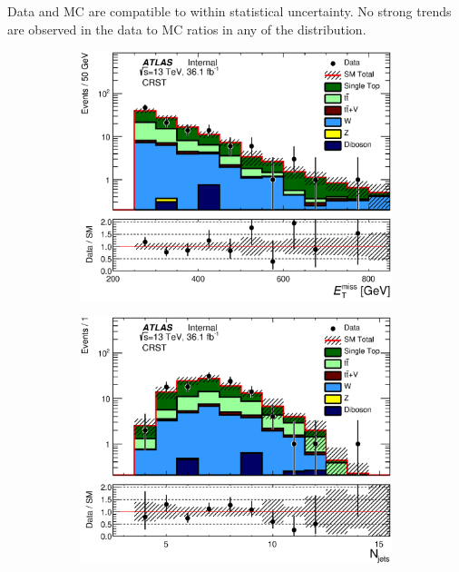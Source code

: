 \indent  Data and MC are compatible to within statistical uncertainty.  No strong trends are observed in the data to MC ratios in any of the distribution. \\

%  

\pagebreak
 
\begin{figure}[h!]
\begin{center}
      \begin{subfigure}[b]{0.40\textwidth}    
\includegraphics[width=\textwidth]{figures/singleTop/postfit/Met_CRST_log.eps}
                 \caption{ }
    \end{subfigure}
     \begin{subfigure}[b]{0.40\textwidth}    
\includegraphics[width=\textwidth]{figures/singleTop/postfit/NJets_CRST_log.eps}

\end{subfigure}
\end{center}
\end{figure}
